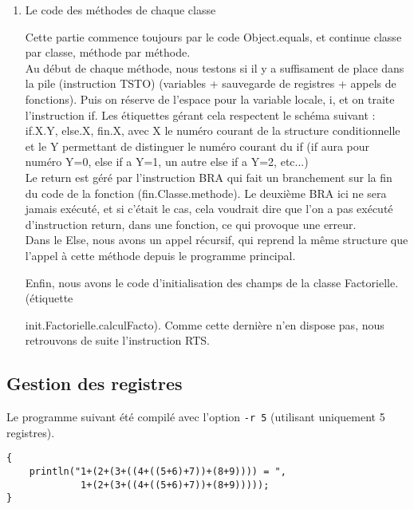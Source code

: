 \documentclass[11pt]{article}
\begin{document}
\begin{enumerate}
\item Le code des méthodes de chaque classe

\hspace{1cm} Cette partie commence toujours par le code Object.equals, et continue classe par classe, méthode par méthode. \\

\hspace{1cm} Au début de chaque méthode, nous testons si il y a suffisament de place dans la pile (instruction TSTO) (variables + sauvegarde de registres + appels de fonctions). Puis on réserve de l'espace pour la variable locale, i, et on traite l'instruction if. Les étiquettes gérant cela respectent le schéma suivant : \\
\hspace{1cm}if.X.Y, else.X, fin.X, avec X le numéro courant de la structure conditionnelle et le Y permettant de distinguer le numéro courant du if (if aura pour numéro Y=0, else if a Y=1, un autre else if a Y=2, etc...)
\\
\hspace{1cm}Le return est géré par l'instruction BRA qui fait un branchement sur la fin du code de la fonction (fin.Classe.methode). Le deuxième BRA ici ne sera jamais exécuté, et si c'était le cas, cela voudrait dire que l'on a pas exécuté d'instruction return, dans une fonction, ce qui provoque une erreur.\\

\hspace{1cm}Dans le Else, nous avons un appel récursif, qui reprend la même structure que l'appel à cette méthode depuis le programme principal. 

\hspace{1cm}Enfin, nous avons le code d'initialisation des champs de la classe Factorielle. (étiquette 

init.Factorielle.calculFacto). Comme cette dernière n'en dispose pas, nous retrouvons de suite l'instruction RTS.
\end{enumerate}
   
\newpage
\subsection{Gestion des registres}
      Le programme suivant été compilé avec l'option \verb!-r 5! (utilisant uniquement 5 registres).
      \lstset{language=Java}
    \begin{lstlisting}
{
	println("1+(2+(3+((4+((5+6)+7))+(8+9)))) = ",
	         1+(2+(3+((4+((5+6)+7))+(8+9)))));
}
    \end{lstlisting}
\end{document}
